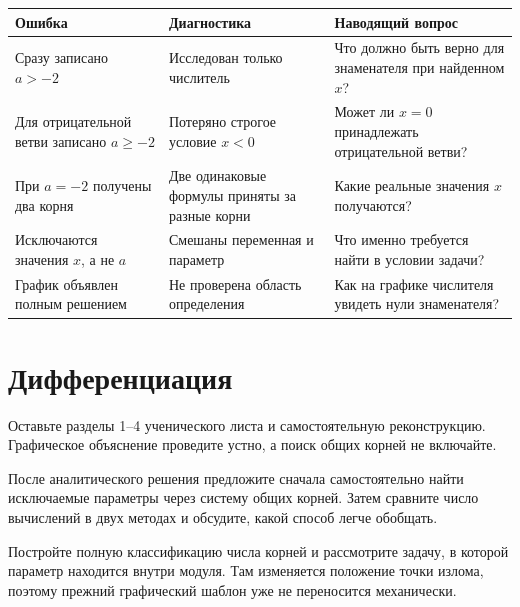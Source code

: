 \begin{center}
  \renewcommand{\arraystretch}{1.42}
  \begin{tabularx}{\textwidth}{
    >{\raggedright\arraybackslash}p{}
    >{\raggedright\arraybackslash}p{}
    >{\raggedright\arraybackslash}X}
    \toprule
    \rowcolor{TableHeader}
    Ошибка & Диагностика & Наводящий вопрос \\
    \midrule
    Сразу записано \(a>-2\)
      & Исследован только числитель
      & Что должно быть верно для знаменателя при найденном \(x\)? \\
    \addlinespace[0.2em]
    Для отрицательной ветви записано \(a\ge-2\)
      & Потеряно строгое условие \(x<0\)
      & Может ли \(x=0\) принадлежать отрицательной ветви? \\
    \addlinespace[0.2em]
    При \(a=-2\) получены два корня
      & Две одинаковые формулы приняты за разные корни
      & Какие реальные значения \(x\) получаются? \\
    \addlinespace[0.2em]
    Исключаются значения \(x\), а не \(a\)
      & Смешаны переменная и параметр
      & Что именно требуется найти в условии задачи? \\
    \addlinespace[0.2em]
    График объявлен полным решением
      & Не проверена область определения
      & Как на графике числителя увидеть нули знаменателя? \\
    \bottomrule
  \end{tabularx}
\end{center}

\section{Дифференциация}

\begin{teacherbox}
  Оставьте разделы 1--4 ученического листа и самостоятельную реконструкцию.
  Графическое объяснение проведите устно, а поиск общих корней не включайте.
\end{teacherbox}

\begin{teacherbox}
  После аналитического решения предложите сначала самостоятельно найти
  исключаемые параметры через систему общих корней. Затем сравните число
  вычислений в двух методах и обсудите, какой способ легче обобщать.
\end{teacherbox}

\begin{teacherbox}
  Постройте полную классификацию числа корней и рассмотрите задачу, в которой
  параметр находится внутри модуля. Там изменяется положение точки излома,
  поэтому прежний графический шаблон уже не переносится механически.
\end{teacherbox}

